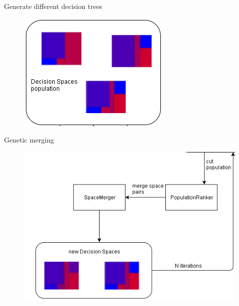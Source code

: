 \documentclass[english]{beamer}
\begin{document}
\begin{frame}{Generate different decision trees}
	\begin{figure}
		\centering
		\includegraphics[scale=1]{figures/dt_population.png}
	\end{figure}	
\end{frame}

{
\begin{frame}{Genetic merging}
	\begin{figure}
		\centering
		\includegraphics[scale=0.7]{figures/genetic_merging.png}
	\end{figure}
\end{frame} }
\end{document}
